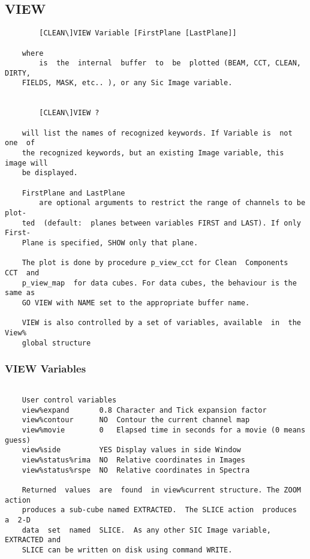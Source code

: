 \subsection{VIEW}
\begin{verbatim}
        [CLEAN\]VIEW Variable [FirstPlane [LastPlane]]

    where
        is  the  internal  buffer  to  be  plotted (BEAM, CCT, CLEAN, DIRTY,
    FIELDS, MASK, etc.. ), or any Sic Image variable.


        [CLEAN\]VIEW ?

    will list the names of recognized keywords. If Variable is  not  one  of
    the recognized keywords, but an existing Image variable, this image will
    be displayed.

    FirstPlane and LastPlane
        are optional arguments to restrict the range of channels to be plot-
    ted  (default:  planes between variables FIRST and LAST). If only First-
    Plane is specified, SHOW only that plane.

    The plot is done by procedure p_view_cct for Clean  Components  CCT  and
    p_view_map  for data cubes. For data cubes, the behaviour is the same as
    GO VIEW with NAME set to the appropriate buffer name.

    VIEW is also controlled by a set of variables, available  in  the  View%
    global structure

\end{verbatim}
\subsubsection{VIEW Variables}
\begin{verbatim}

    User control variables
    view%expand       0.8 Character and Tick expansion factor
    view%contour      NO  Contour the current channel map
    view%movie        0   Elapsed time in seconds for a movie (0 means guess)
    view%side         YES Display values in side Window
    view%status%rima  NO  Relative coordinates in Images
    view%status%rspe  NO  Relative coordinates in Spectra

    Returned  values  are  found  in view%current structure. The ZOOM action
    produces a sub-cube named EXTRACTED.  The SLICE action  produces  a  2-D
    data  set  named  SLICE.  As any other SIC Image variable, EXTRACTED and
    SLICE can be written on disk using command WRITE.

\end{verbatim}
